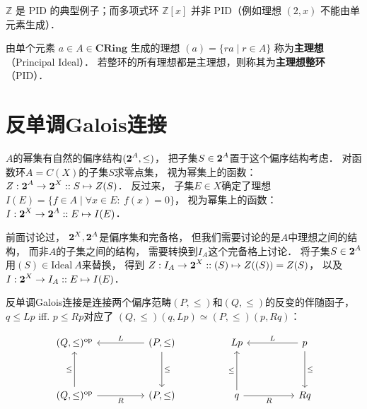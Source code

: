 $\mathbb{Z}$ 是 PID 的典型例子；而多项式环 $\mathbb{Z}[x]$ 并非 PID（例如理想 $(2, x)$ 不能由单元素生成）．

\begin{framed}
\noindent
由单个元素 $a \in A \in \textbf{CRing}$ 生成的理想 $(a) = \{ra \mid r \in A\}$ 称为\textbf{主理想}（Principal Ideal）．
若整环的所有理想都是主理想，则称其为\textbf{主理想整环}（PID）．
\end{framed}

\section{反单调Galois连接}

$A$的幂集有自然的偏序结构$(\textbf 2^A,\leq)$，
把子集$S \in \textbf 2^A$置于这个偏序结构考虑．
对函数环$A = C(X)$的子集$S$求零点集，
视为幂集上的函数：
$Z: \textbf 2^A \to \textbf 2^X:: S \mapsto Z(S)$．
反过来，
子集$E \in X$确定了理想
$I(E) = \{f \in A \mid \forall x \in E:\ f(x) = 0\}$，
视为幂集上的函数：
$I: \textbf 2^X \to \textbf 2^A :: E \mapsto I(E)$．

前面讨论过，
$\textbf 2^X,\textbf 2^A$是偏序集和完备格，
但我们需要讨论的是$A$中理想之间的结构，
而非$A$的子集之间的结构，
需要转换到$I_A$这个完备格上讨论．
将子集$S\in\textbf 2^A$用$(S)\in \text{Ideal} \ A$来替换，
得到
$Z: I_A \to \textbf 2^X:: (S) \mapsto Z((S)) = Z(S)$，
以及
$I: \textbf 2^X \to I_A :: E \mapsto I(E)$．

\begin{framed}
\noindent

反单调Galois连接是连接两个偏序范畴$(P,\leq)$和$(Q,\leq)$的反变的伴随函子，
$q \leq Lp$ iff. $p \leq Rp$对应了
$(Q,\leq)(q,Lp) \simeq (P,\leq)(p,Rq)$：

$$
\begin{tikzcd}
{(Q,\leq)^\text{op}}                                     &  & {(P,\leq)} \arrow[dd, "\leq"] \arrow[ll, "L"'] &  & Lp                                    &  & p \arrow[ll, "L"'] \arrow[dd, "\leq"] \\
                                                         &  &                                                &  &                                       &  &                                       \\
{(Q,\leq)^\text{op}} \arrow[uu, "\leq"] \arrow[rr, "R"'] &  & {(P,\leq)}                                     &  & q \arrow[uu, "\leq"] \arrow[rr, "R"'] &  & Rq                                   
\end{tikzcd}
$$

\end{framed}

